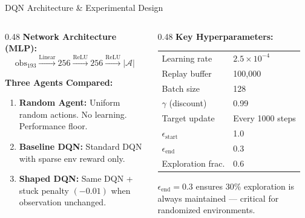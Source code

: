 \documentclass[11pt,aspectratio=169]{beamer}
\begin{document}
\begin{frame}{DQN Architecture \& Experimental Design}
    \begin{columns}
    \begin{column}{0.48\textwidth}
        \textbf{Network Architecture (MLP):}
        \begin{equation*}
            \text{obs}_{193} \xrightarrow{\text{Linear}} 256 \xrightarrow{\text{ReLU}} 256 \xrightarrow{\text{ReLU}} |\mathcal{A}|
        \end{equation*}

        \vspace{0.1cm}
        \textbf{Three Agents Compared:}
        \begin{enumerate}
            \item \textbf{Random Agent:} Uniform random actions. No learning. Performance floor.
            \item \textbf{Baseline DQN:} Standard DQN with sparse env reward only.
            \item \textbf{Shaped DQN:} Same DQN + stuck penalty $(-0.01)$ when observation unchanged.
        \end{enumerate}
    \end{column}
    \begin{column}{0.48\textwidth}
        \textbf{Key Hyperparameters:}

        \vspace{0.1cm}
        \begin{table}[h]
        \centering
        \small
        \begin{tabular}{ll}
            \toprule
            Learning rate & $2.5 \times 10^{-4}$ \\
            Replay buffer & 100,000 \\
            Batch size & 128 \\
            $\gamma$ (discount) & 0.99 \\
            Target update & Every 1000 steps \\
            $\epsilon_{\text{start}}$ & 1.0 \\
            $\epsilon_{\text{end}}$ & 0.3 \\
            Exploration frac. & 0.6 \\
            \bottomrule
        \end{tabular}
        \end{table}

        \vspace{0.1cm}
        \small
        $\epsilon_{\text{end}} = 0.3$ ensures 30\% exploration is always maintained — critical for randomized environments.
    \end{column}
    \end{columns}
\end{frame}
\end{document}
